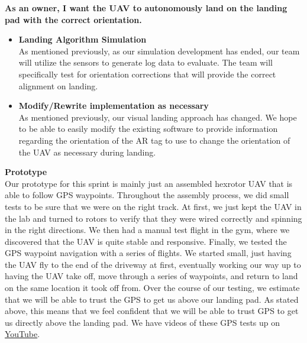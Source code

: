 \vspace{3mm}
\noindent \large{\textbf{As an owner, I want the UAV to autonomously land on the landing pad with the correct orientation.}}
\normalsize
\begin{itemize}
\item \textbf{Landing Algorithm Simulation}\\
As mentioned previously, as our simulation development has ended, our team will utilize the sensors to generate log data to evaluate. The team will specifically test for orientation corrections that will provide the correct alignment on landing.
\item \textbf{Modify/Rewrite implementation as necessary}\\
As mentioned previously, our visual landing approach has changed. We hope to be able to easily modify the existing software to provide information regarding the orientation of the AR tag to use to change the orientation of the UAV as necessary during landing.
\end{itemize}

\vspace{6mm}
\noindent\Large{\textbf{Prototype}}\\
\normalsize
Our prototype for this sprint is mainly just an assembled hexrotor UAV that is able to follow GPS waypoints. Throughout the assembly process, we did small tests to be sure that we were on the right track. At first, we just kept the UAV in the lab and turned to rotors to verify that they were wired correctly and spinning in the right directions. We then had a manual test flight in the gym, where we discovered that the UAV is quite stable and responsive. Finally, we tested the GPS waypoint navigation with a series of flights. We started small, just having the UAV fly to the end of the driveway at first, eventually working our way up to having the UAV take off, move through a series of waypoints, and return to land on the same location it took off from. Over the course of our testing, we estimate that we will be able to trust the GPS to get us above our landing pad. As stated above, this means that we feel confident that we will be able to trust GPS to get us directly above the landing pad. \newline\newline
We have videos of these GPS tests up on \href{https://www.youtube.com/channel/UCfcuqDXKMLgbUWu3rt9rITA}{YouTube}.

